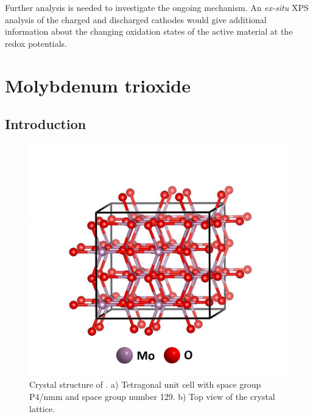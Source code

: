 Further analysis is needed to investigate the ongoing mechanism. An \textit{ex-situ} XPS analysis of the charged and discharged cathodes would give additional information about the changing oxidation states of the active material at the redox potentials.


\section{Molybdenum trioxide}

\subsection{Introduction}

 \begin{figure}[th!]
  \centering
  \includegraphics[width=\textwidth]{Figures/chap6fig/MoO3crys}
    \caption{Crystal structure of . a) Tetragonal unit cell with space group P4/nmm and space group number 129. b) Top view of the crystal lattice.}
  \label{Figures/chap6fig:MoO3crys}
\end{figure}

